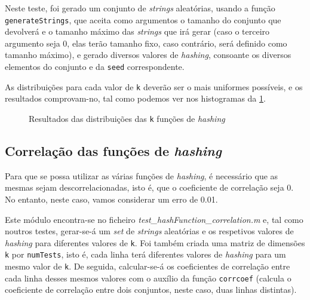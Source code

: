 \documentclass[a4paper,11pt,openright,oneside]{report}
\begin{document}
Neste teste, foi gerado um conjunto de \textit{strings} aleatórias, usando a função \texttt{generateStrings}, que aceita como argumentos o tamanho do conjunto que devolverá e o tamanho máximo das \textit{strings} que irá gerar (caso o terceiro argumento seja 0, elas terão tamanho fixo, caso contrário, será definido como tamanho máximo), e gerado diversos valores de \textit{hashing}, consoante os diversos elementos do conjunto e da \texttt{seed} correspondente.

As distribuições para cada valor de \texttt{k} deverão ser o mais uniformes possíveis, e os resultados comprovam-no, tal como podemos ver nos histogramas da \ref{fig:hashdist}.

\begin{figure}[ht]	
\center
{}
\caption{Resultados das distribuições das \texttt{k} funções de \textit{hashing}}
\label{fig:hashdist}
\end{figure}

\subsection{Correlação das funções de \textit{hashing}}
\label{subsec.hashcorr}

Para que se possa utilizar as várias funções de \textit{hashing}, é necessário que as mesmas sejam descorrelacionadas, isto é, que o coeficiente de correlação seja 0. No entanto, neste caso, vamos considerar um erro de 0.01.

Este módulo encontra-se no ficheiro \textit{test\_hashFunction\_correlation.m} e, tal como noutros testes, gerar-se-á um \textit{set} de \textit{strings} aleatórias e os respetivos valores de \textit{hashing} para diferentes valores de \texttt{k}. Foi também criada uma matriz de dimensões \texttt{k} por \texttt{numTests}, isto é, cada linha terá diferentes valores de \textit{hashing} para um mesmo valor de \texttt{k}. De seguida, calcular-se-á os coeficientes de correlação entre cada linha desses mesmos valores com o auxílio da função \texttt{corrcoef} (calcula o coeficiente de correlação entre dois conjuntos, neste caso, duas linhas distintas).
\end{document}
